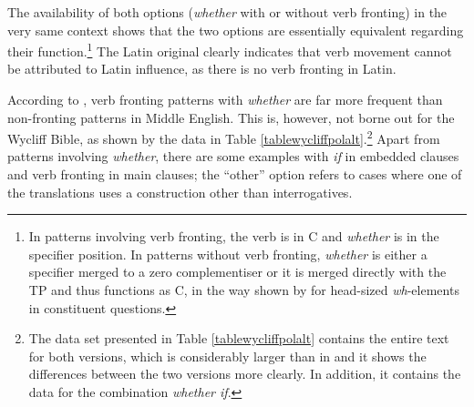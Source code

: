The availability of both options (\textit{whether} with or without verb fronting) in the very same context shows that the two options are essentially equivalent regarding their function.\footnote{In patterns involving verb fronting, the verb is in C and \textit{whether} is in the specifier position. In patterns without verb fronting, \textit{whether} is either a specifier merged to a zero complementiser or it is merged directly with the TP and thus functions as C, in the way shown by \citet{bayerbrandner2008} for head-sized \textit{wh}-elements in constituent questions.} The Latin original clearly indicates that verb movement cannot be attributed to Latin influence, as there is no verb fronting in Latin. 

According to \citet[279]{fischer1992}, verb fronting patterns with \textit{whether} are far more frequent than non-fronting patterns in Middle English. This is, however, not borne out for the Wycliff Bible, as shown by the data in Table \ref{tablewycliffpolalt}.\footnote{The data set presented in Table \ref{tablewycliffpolalt} contains the entire text for both versions, which is considerably larger than in \citet[142]{bacskaiatkari2019me} and it shows the differences between the two versions more clearly. In addition, it contains the data for the combination \textit{whether if}.} Apart from patterns involving \textit{whether}, there are some examples with \textit{if} in embedded clauses and verb fronting in main clauses; the ``other'' option refers to cases where one of the translations uses a construction other than interrogatives.\largerpage

